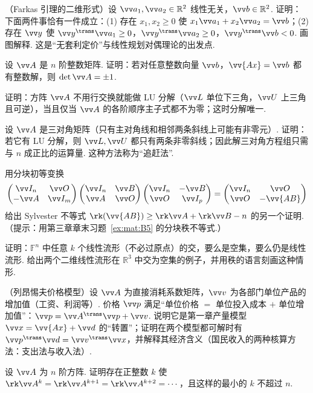 {		\Cgroup
		\begin{exC}
			\item\label{ex:sol:C1} （Farkas 引理的二维形式）设 $\vv a_1,\vv a_2\in\mathbb{R}^2$ 线性无关，$\vv b\in\mathbb{R}^2$. 证明：下面两件事恰有一件成立：(1) 存在 $x_1,x_2\ge0$ 使 $x_1\vv a_1+x_2\vv a_2=\vv b$；(2) 存在 $\vv y$ 使 $\vv y^\trans\vv a_1\ge0$，$\vv y^\trans\vv a_2\ge0$，$\vv y^\trans\vv b<0$. 画图解释. 这是“无套利定价”与线性规划对偶理论的出发点.
			\item\label{ex:sol:C2} 设 $\vv A$ 是 $n$ 阶整数矩阵. 证明：若对任意整数向量 $\vv b$，$\vv{Ax}=\vv b$ 都有整数解，则 $\det\vv A=\pm1$.
			\item\label{ex:sol:C3} 证明：方阵 $\vv A$ 不用行交换就能做 LU 分解（$\vv L$ 单位下三角，$\vv U$ 上三角且可逆），当且仅当 $\vv A$ 的各阶顺序主子式都不为零；这时分解唯一.
			\item\label{ex:sol:C4} 设 $\vv A$ 是三对角矩阵（只有主对角线和相邻两条斜线上可能有非零元）. 证明：若它有 LU 分解，则 $\vv L,\vv U$ 都只有两条非零斜线；因此解三对角方程组只需与 $n$ 成正比的运算量. 这种方法称为“追赶法”.
			\item\label{ex:sol:C5} 用分块初等变换
			\[\begin{pmatrix}\vv I_n&\vv O\\ -\vv A&\vv I_m\end{pmatrix}\begin{pmatrix}\vv I_n&\vv B\\ \vv A&\vv O\end{pmatrix}\begin{pmatrix}\vv I_n&-\vv B\\ \vv O&\vv I_p\end{pmatrix}=\begin{pmatrix}\vv I_n&\vv O\\ \vv O&-\vv{AB}\end{pmatrix}\]
			给出 Sylvester 不等式 $\rk(\vv{AB})\ge\rk\vv A+\rk\vv B-n$ 的另一个证明.（提示：用第三章章末习题~\ref{ex:mat:B5} 的分块秩不等式.）
			\item\label{ex:sol:C6} 证明：$\mathbb{F}^n$ 中任意 $k$ 个线性流形（不必过原点）的交，要么是空集，要么仍是线性流形. 给出两个二维线性流形在 $\mathbb{R}^3$ 中交为空集的例子，并用秩的语言刻画这种情形.
			\item\label{ex:sol:C7} （列昂惕夫价格模型）设 $\vv A$ 为直接消耗系数矩阵，$\vv v$ 为各部门单位产品的增加值（工资、利润等）. 价格 $\vv p$ 满足“单位价格 $=$ 单位投入成本 $+$ 单位增加值”：$\vv p=\vv A^\trans\vv p+\vv v$. 说明它是第一章产量模型 $\vv x=\vv{Ax}+\vv d$ 的“转置”；证明在两个模型都可解时有 $\vv p^\trans\vv d=\vv v^\trans\vv x$，并解释其经济含义（国民收入的两种核算方法：支出法与收入法）.
			\item\label{ex:sol:C8} 设 $\vv A$ 为 $n$ 阶方阵. 证明存在正整数 $k$ 使 $\rk\vv A^k=\rk\vv A^{k+1}=\rk\vv A^{k+2}=\cdots$，且这样的最小的 $k$ 不超过 $n$.
		\end{exC}
	}
	
